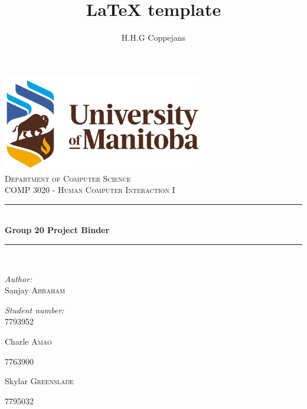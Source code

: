 \documentclass[a4paper,12pt]{report}
\author{H.H.G Coppejans}
\title{ LaTeX template}
\newcommand{\HRule}{\rule{\linewidth}{0.5mm}}
\begin{document}
\setlength{\parskip}{6pt}
\begin{titlepage}

\begin{center}
\includegraphics[width=0.65\textwidth]{./uofmlogolarge.png}\\[0.4cm]    
\textsc{\LARGE Department of Computer Science}\\[1.5cm]
\textsc{\Large COMP 3020 - Human Computer Interaction I}\\[0.5cm]
\HRule \\[0.4cm]
{ \huge \bfseries Group 20 Project Binder}\\[0.4cm]
\HRule \\[0.4cm]
\begin{minipage}{0.4\textwidth}
\begin{flushleft} \large
\emph{Author:}\\

Sanjay \textsc{Abraham}
\end{flushleft}
\end{minipage}
\begin{minipage}{0.4\textwidth}
\begin{flushright} \large
\emph{Student number:} \\
7793952
\end{flushright}
\end{minipage}

\begin{minipage}{0.4\textwidth}
\begin{flushleft} \large
Charle \textsc{Amao}
\end{flushleft}
\end{minipage}
\begin{minipage}{0.4\textwidth}
\begin{flushright} \large
7763900
\end{flushright}
\end{minipage}

\begin{minipage}{0.4\textwidth}
\begin{flushleft} \large
Skylar \textsc{Greenslade}
\end{flushleft}
\end{minipage}
\begin{minipage}{0.4\textwidth}
\begin{flushright} \large
7795032
\end{flushright}
\end{minipage}


\end{center}
\end{titlepage}
\end{document}
